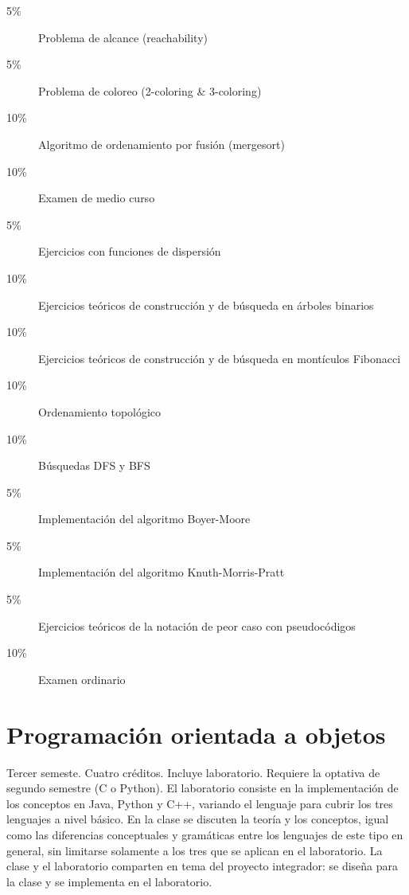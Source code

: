\documentclass{article}
\begin{document}
\begin{multicols}{4}
\begin{description}
\item[5\%]{Problema de alcance (reachability)}
\item[5\%]{Problema de coloreo (2-coloring \& 3-coloring)}

\item[10\%]{Algoritmo de ordenamiento por fusi\'{o}n (mergesort)}

\item[10\%]{Examen de medio curso}

\item[5\%]{Ejercicios con funciones de dispersi\'{o}n}

\item[10\%]{Ejercicios te\'{o}ricos de construcci\'{o}n y de
  b\'{u}squeda en \'{a}rboles binarios}

\item[10\%]{Ejercicios te\'{o}ricos de construcci\'{o}n y de
  b\'{u}squeda en mont\'{i}culos Fibonacci}

\item[10\%]{Ordenamiento topol\'{o}gico}

\item[10\%]{B\'{u}squedas DFS y BFS}

\item[5\%]{Implementaci\'{o}n del algoritmo Boyer-Moore}
\item[5\%]{Implementaci\'{o}n del algoritmo Knuth-Morris-Pratt}  

\item[5\%]{Ejercicios te\'{o}ricos de la notaci\'{o}n de peor caso
  con pseudoc\'{o}digos}

\item[10\%]{Examen ordinario}

\end{description}

\vfill\null \columnbreak

\hypertarget{poao}{\section*{Programaci\'{o}n orientada a objetos}}

Tercer semeste. Cuatro cr\'{e}ditos. Incluye laboratorio. Requiere la
optativa de segundo semestre (C o Python). El laboratorio consiste en
la implementaci\'{o}n de los conceptos en Java, Python y C++, variando el
lenguaje para cubrir los tres lenguajes a nivel b\'{a}sico. En la clase se
discuten la teor\'{i}a y los conceptos, igual como las diferencias
conceptuales y gram\'{a}ticas entre los lenguajes de este tipo en general,
sin limitarse solamente a los tres que se aplican en el
laboratorio. La clase y el laboratorio comparten en tema del proyecto
integrador: se dise\~{n}a para la clase y se implementa en el laboratorio.


\end{multicols}
\end{document}
